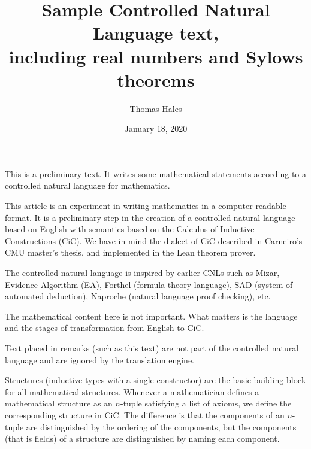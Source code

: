 \documentclass[12pt]{article}
\title{Sample Controlled Natural Language text,\\ including real numbers and Sylows theorems}
\date{January 18, 2020}
\author{Thomas Hales}
\numberwithin{definition}{section}
\begin{document}
\maketitle

\setcounter{tocdepth}{1}
\tableofcontents
\newpage




\begin{cnl}


\CnlCustom{}
\CnlCustom{}




\begin{remark}
This is a preliminary text.  It
writes some mathematical statements according to a
controlled natural language for mathematics.
\end{remark}



\begin{remark}
This article is an experiment in writing mathematics in a computer
readable format.  It is a preliminary step in the creation of a
controlled natural language based on English with semantics based on
the Calculus of Inductive Constructions (CiC).  We have in mind the
dialect of CiC described in Carneiro's CMU master's thesis, and
implemented in the Lean theorem prover.

The controlled natural language is inspired by earlier CNLs such as
Mizar, Evidence Algorithm (EA), Forthel (formula theory language), SAD
(system of automated deduction), Naproche (natural language proof
checking), etc.

The mathematical content here is not important.  What matters is the
language and the stages of transformation from English to CiC.

Text placed in remarks (such as this text) are not part of the
controlled natural language and are ignored by the translation engine.
\end{remark}




\begin{remark}
Structures (inductive types with a single constructor) are the basic
building block for all mathematical structures. Whenever a
mathematician defines a mathematical structure as an $n$-tuple
satisfying a list of axioms, we define the corresponding
structure in CiC. The difference is that the components of an
$n$-tuple are distinguished by the ordering of the components, but the
components (that is fields) of a structure are distinguished by naming
each component.


\end{remark}
\end{cnl}
\end{document}
